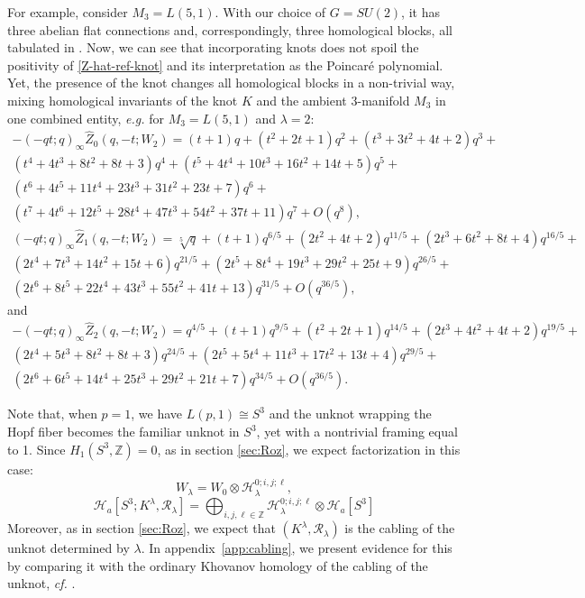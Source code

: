 \documentclass[hyper,letterpaper]{JHEP3}
\newcommand{\be}{\begin{equation}}
\newcommand{\ee}{\end{equation}}
\newcommand{\Z}{{\mathbb Z}}
\renewcommand{\hat}{\widehat}
\def\CH{{\mathcal H}}
\def\CR{{\mathcal R}}
\begin{document}
For example, consider $M_3 = L(5,1)$. With our choice of $G = SU(2)$, it has three abelian flat connections and,
correspondingly, three homological blocks, all tabulated in \cite[sec.6]{Gukov:2016gkn}.
Now, we can see that incorporating knots does not spoil the positivity of \eqref{Z-hat-ref-knot}
and its interpretation as the Poincar\'e polynomial. Yet, the presence of the knot changes all homological blocks
in a non-trivial way, mixing homological invariants of the knot $K$ and the ambient 3-manifold $M_3$ in one combined entity,
{\it e.g.} for $M_3 = L(5,1)$ and $\lambda=2$:
\begin{multline}
	-(-qt;q)_\infty\hat{Z}_0(q,-t;W_2)=
	(t+1) q+\left(t^2+2 t+1\right) q^2+\left(t^3+3 t^2+4 t+2\right) q^3+\\ \left(t^4+4 t^3+8 t^2+8 t+3\right) q^4+\left(t^5+4 t^4+10 t^3+16
	   t^2+14 t+5\right) q^5+
	   \\ \left(t^6+4 t^5+11 t^4+23 t^3+31 t^2+23 t+7\right) q^6+\\
	   \left(t^7+4 t^6+12 t^5+28 t^4+47 t^3+54 t^2+37 t+11\right)
	   q^7+O\left(q^8\right),
\end{multline}
\begin{multline}
	(-qt;q)_\infty\hat{Z}_1(q,-t;W_2)=
	\sqrt[5]{q}+(t+1) q^{6/5}+\left(2 t^2+4 t+2\right) q^{11/5}+\left(2 t^3+6 t^2+8 t+4\right) q^{16/5}+\\
	\left(2 t^4+7 t^3+14 t^2+15 t+6\right)
	   q^{21/5}+\left(2 t^5+8 t^4+19 t^3+29 t^2+25 t+9\right) q^{26/5}+\\
	   \left(2 t^6+8 t^5+22 t^4+43 t^3+55 t^2+41 t+13\right)
	   q^{31/5}+O\left(q^{36/5}\right),
\end{multline}
and
\begin{multline}
	-(-qt;q)_\infty\hat{Z}_2(q,-t;W_2)=
	q^{4/5}+(t+1) q^{9/5}+\left(t^2+2 t+1\right) q^{14/5}+\left(2 t^3+4 t^2+4 t+2\right) q^{19/5}+\\
	\left(2 t^4+5 t^3+8 t^2+8 t+3\right)
	   q^{24/5}+\left(2 t^5+5 t^4+11 t^3+17 t^2+13 t+4\right) q^{29/5}+\\
	   \left(2 t^6+6 t^5+14 t^4+25 t^3+29 t^2+21 t+7\right)
	   q^{34/5}+O\left(q^{36/5}\right).
\end{multline}

Note that, when $p=1$, we have $L(p,1)\cong S^3$ and the unknot wrapping the Hopf fiber becomes
the familiar unknot in $S^3$, yet with a nontrivial framing equal to 1.
Since $H_1(S^3,\Z)=0$, as in section \ref{sec:Roz}, we expect factorization in this case:
\be
W_\lambda=W_0\otimes \CH_{\lambda}^{0;i,j;\ell},
\ee
\begin{equation}
\CH_a[S^3;K^{\lambda},\CR_\lambda]=\bigoplus_{i,j,\ell\in\Z}\CH_{\lambda}^{0;i,j;\ell}\otimes {\CH}_a[S^3]
\end{equation}
Moreover, as in section \ref{sec:Roz}, we expect that $(K^{\lambda},\CR_\lambda)$ is the cabling of the unknot determined by $\lambda$.
In appendix~\ref{app:cabling}, we present evidence for this by comparing it with the ordinary Khovanov homology
of the cabling of the unknot, {\it cf.} \cite{khovanov2005categorifications}.
\end{document}
